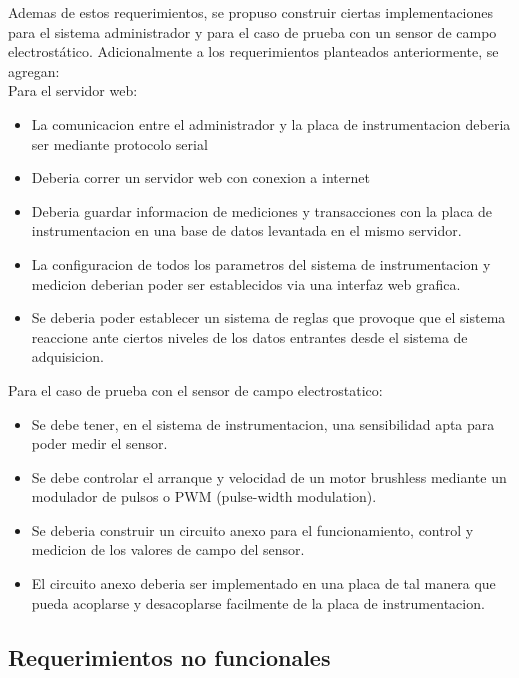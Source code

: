 Ademas de estos requerimientos, se propuso construir ciertas implementaciones para el sistema administrador y para el caso de prueba con un sensor de campo electrostático. Adicionalmente a los requerimientos planteados anteriormente, se agregan: \\


Para el servidor web:
\begin{itemize}
	\item La comunicacion entre el administrador y la placa de instrumentacion deberia ser mediante protocolo serial
	\item Deberia correr un servidor web con conexion a internet
	\item Deberia guardar informacion de mediciones y transacciones con la placa de instrumentacion en una base de datos levantada en el mismo servidor.
    \item La configuracion de todos los parametros del sistema de instrumentacion y medicion deberian poder ser establecidos via una interfaz web grafica.
    \item Se deberia poder establecer un sistema de reglas que provoque que el sistema reaccione ante ciertos niveles de los datos entrantes desde el sistema de adquisicion.
\end{itemize}

Para el caso de prueba con el sensor de campo electrostatico:
\begin{itemize}
    \item Se debe tener, en el sistema de instrumentacion, una sensibilidad apta para poder medir el sensor.
    \item Se debe controlar el arranque y velocidad de un motor brushless mediante un modulador de pulsos o PWM (pulse-width modulation).
	\item Se deberia construir un circuito anexo para el funcionamiento, control y medicion de los valores de campo del sensor.
	\item El circuito anexo deberia ser implementado en una placa de tal manera que pueda acoplarse y desacoplarse facilmente de la placa de instrumentacion.
\end{itemize}


\subsection{Requerimientos no funcionales} %
\label{sub:requerimientos_no_funcionales}

